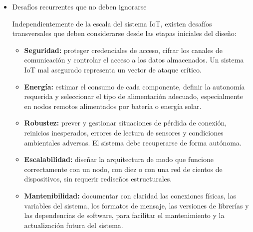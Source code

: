 \begin{itemize}
\begin{itemize}
            \item Desafíos recurrentes que no deben ignorarse

            Independientemente de la escala del sistema IoT, existen desafíos transversales que deben considerarse desde las etapas iniciales del diseño:

                \begin{itemize}
                    \item \textbf{Seguridad:} proteger credenciales de acceso, cifrar los canales de comunicación y controlar el acceso a los datos almacenados. Un sistema IoT mal asegurado representa un vector de ataque crítico.
                    \item \textbf{Energía:} estimar el consumo de cada componente, definir la autonomía requerida y seleccionar el tipo de alimentación adecuado, especialmente en nodos remotos alimentados por batería o energía solar.
                    \item \textbf{Robustez:} prever y gestionar situaciones de pérdida de conexión, reinicios inesperados, errores de lectura de sensores y condiciones ambientales adversas. El sistema debe recuperarse de forma autónoma.
                    \item \textbf{Escalabilidad:} diseñar la arquitectura de modo que funcione correctamente con un nodo, con diez o con una red de cientos de dispositivos, sin requerir rediseños estructurales.
                    \item \textbf{Mantenibilidad:} documentar con claridad las conexiones físicas, las variables del sistema, los formatos de mensaje, las versiones de librerías y las dependencias de software, para facilitar el mantenimiento y la actualización futura del sistema.
                \end{itemize}

        \end{itemize}

\end{itemize}